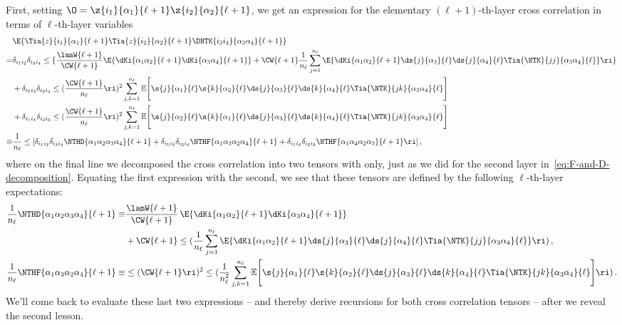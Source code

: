 First, setting $\O=\z{i_1}{\alpha_1}{\ell+1}\z{i_2}{\alpha_2}{\ell+1}$, we get an expression for the  elementary $(\ell+1)$-th-layer cross correlation in terms of $\ell$-th-layer variables %
\begin{align}\label{eq:D-F-decomposition-general-layer}\index{tensor decomposition!NTK-preactivation $D$/$F$}
&\E{\Tia{z}{i_1}{\alpha_1}{\ell+1}\Tia{z}{i_2}{\alpha_2}{\ell+1}\DNTK{i_3i_4}{\alpha_3\alpha_4}{\ell+1}}\, \notag\\
=&\delta_{i_1i_2}\delta_{i_3i_4}\le\{\frac{\lamW{\ell+1}}{\CW{\ell+1}}\E{\dKi{\alpha_1\alpha_2}{\ell+1}\dKi{\alpha_3\alpha_4}{\ell+1}}+\CW{\ell+1}\frac{1}{n_{\ell}}\sum_{j=1}^{n_{\ell}}\E{\dKi{\alpha_1\alpha_2}{\ell+1}\ds{j}{\alpha_3}{\ell}\ds{j}{\alpha_4}{\ell}\Tia{\NTK}{jj}{\alpha_3\alpha_4}{\ell}}\ri\}\, \nonumber\\
&+\delta_{i_1i_3}\delta_{i_2i_4}\le(\frac{\CW{\ell+1}}{n_{\ell}}\ri)^2\sum_{j,k=1}^{n_{\ell}}\mathbb{E}\Bigg[\s{j}{\alpha_1}{\ell}\s{k}{\alpha_2}{\ell}\ds{j}{\alpha_3}{\ell}\ds{k}{\alpha_4}{\ell}\Tia{\NTK}{jk}{\alpha_3\alpha_4}{\ell} \Bigg]\, \nonumber\\
&+\delta_{i_1i_4}\delta_{i_2i_3}\le(\frac{\CW{\ell+1}}{n_{\ell}}\ri)^2\sum_{j,k=1}^{n_{\ell}}\mathbb{E}\Bigg[\s{j}{\alpha_2}{\ell}\s{k}{\alpha_1}{\ell}\ds{j}{\alpha_3}{\ell}\ds{k}{\alpha_4}{\ell}\Tia{\NTK}{jk}{\alpha_3\alpha_4}{\ell} \Bigg]\, \nonumber\\
\equiv&\frac{1}{n_{\ell}}\le[\delta_{i_1i_2}\delta_{i_3i_4} \NTHD{\alpha_1\alpha_2\alpha_3\alpha_4}{\ell+1}+\delta_{i_1i_3}\delta_{i_2i_4}\NTHF{\alpha_1\alpha_3\alpha_2\alpha_4}{\ell+1}+\delta_{i_1i_4}\delta_{i_2i_3}\NTHF{\alpha_1\alpha_4\alpha_2\alpha_3}{\ell+1}\ri]\, ,  
\end{align}
where on the final line we decomposed the cross correlation into two tensors with  only,
just as we did for the second layer in~\eqref{eq:F-and-D-decomposition}.
Equating the first expression with the second, we see that these tensors are defined by the following $\ell$-th-layer expectations:
\begin{align}
\frac{1}{n_{\ell}}\NTHD{\alpha_1\alpha_2\alpha_3\alpha_4}{\ell+1}\equiv&\frac{\lamW{\ell+1}}{\CW{\ell+1}}\,\E{\dKi{\alpha_1\alpha_2}{\ell+1}\dKi{\alpha_3\alpha_4}{\ell+1}}\, \label{eq:D-recursion-almost-there}\\
&+\CW{\ell+1}\le(\frac{1}{n_{\ell}}\sum_{j=1}^{n_{\ell}}\E{\dKi{\alpha_1\alpha_2}{\ell+1}\ds{j}{\alpha_3}{\ell}\ds{j}{\alpha_4}{\ell}\Tia{\NTK}{jj}{\alpha_3\alpha_4}{\ell}}\ri)\, ,\notag\\
\frac{1}{n_{\ell}}\NTHF{\alpha_1\alpha_3\alpha_2\alpha_4}{\ell+1}\equiv&\le(\CW{\ell+1}\ri)^2\le(\frac{1}{n_{\ell}^2}\sum_{j,k=1}^{n_{\ell}}\mathbb{E}\Bigg[\s{j}{\alpha_1}{\ell}\s{k}{\alpha_2}{\ell}\ds{j}{\alpha_3}{\ell}\ds{k}{\alpha_4}{\ell}\Tia{\NTK}{jk}{\alpha_3\alpha_4}{\ell} \Bigg]\ri)\, .\label{eq:F-recursion-almost-there}
\end{align}
We'll come back to evaluate these last two expressions -- and thereby derive recursions for both cross correlation tensors -- after we reveal the second lesson.

